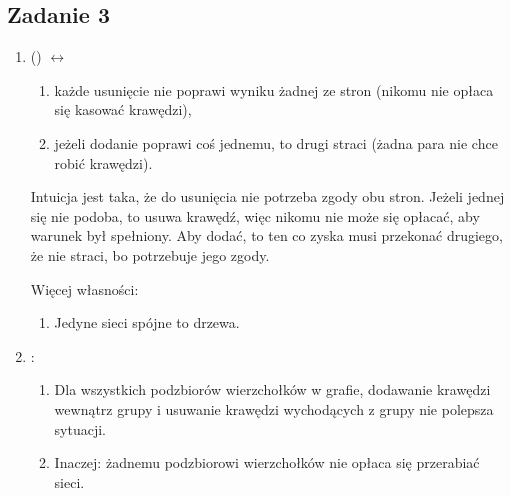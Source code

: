 \subsection{Zadanie 3}
\begin{enumerate}
  \item
     () $\leftrightarrow$
    \begin{enumerate}
      \item
        każde usunięcie nie poprawi wyniku żadnej ze stron (nikomu nie opłaca się kasować krawędzi),
      \item
        jeżeli dodanie poprawi coś jednemu, to drugi straci
         (żadna para nie chce robić krawędzi).
    \end{enumerate}

     Intuicja jest taka, że do usunięcia nie potrzeba zgody obu stron. Jeżeli
     jednej się nie podoba, to usuwa krawędź, więc nikomu nie może się opłacać,
     aby warunek był spełniony. Aby dodać, to ten co zyska musi przekonać
     drugiego, że nie straci, bo potrzebuje jego zgody.

     Więcej własności:
    \begin{enumerate}
      \item
        Jedyne  sieci spójne to drzewa.
    \end{enumerate}

   \item
     :
     \begin{enumerate}
       \item
         Dla wszystkich podzbiorów wierzchołków w grafie, dodawanie krawędzi
         wewnątrz grupy i usuwanie krawędzi wychodących z grupy nie polepsza
         sytuacji.
       \item
         Inaczej: żadnemu podzbiorowi wierzchołków nie opłaca się przerabiać sieci.
     \end{enumerate}
\end{enumerate}

